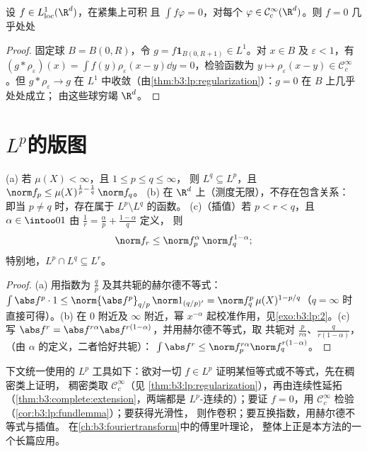 \begin{corollary}[变分法基本
引理]\label{cor:b3:lp:fundlemma}
设 $f \in L^1_{\mathrm{loc}}(\R^d)$，在紧集上可积
且 $\int f\varphi = 0$，对每个 $\varphi \in \mathcal
C^\infty_c(\R^d)$。则 $f = 0$ 几乎处处
\end{corollary}

\begin{proof}
固定球 $B = B(0, R)$，令 $g = f\mathbf 1_{B(0, R+1)}
\in L^1$。对 $x \in B$ 及 $\varepsilon < 1$，有 $(g *
\rho_\varepsilon)(x) = \int f(y)\rho_\varepsilon(x - y)\dd y =
0$，检验函数为 $y \mapsto \rho_\varepsilon(x-y)
\in \mathcal C_c^\infty$。但 $g * \rho_\varepsilon \to g$ 在
$L^1$ 中收敛（由\cref{thm:b3:lp:regularization}）：$g = 0$ 在 $B$ 上几乎处处成立；
由这些球穷竭 $\R^d$。
\end{proof}

\section{\texorpdfstring{$L^p$}{Lp}的版图}

\begin{proposition}\label{prop:b3:lp:inclusions}
(a) 若 $\mu(X) < \infty$，且 $1 \leq p \leq q \leq \infty$，
则 $L^q \subseteq L^p$，且 $\norm f_p \leq
\mu(X)^{\frac1p - \frac1q}\,\norm f_q$。
(b) 在 $\R^d$ 上（测度无限），不存在包含关系：
即当 $p \neq q$ 时，存在属于 $L^p\setminus L^q$ 的函数。
(c)（插值）若 $p < r < q$，且 $\alpha \in \intoo01$
由 $\frac1r = \frac\alpha p + \frac{1 - \alpha}q$ 定义，
则
\[
\norm f_r \leq \norm f_p^{\alpha}\,\norm f_q^{1 - \alpha} ;
\]
特别地，$L^p \cap L^q \subseteq L^r$。
\end{proposition}

\begin{proof}
(a) 用指数为 $\frac qp$ 及其共轭的赫尔德不等式：
$\int\abs f^p\cdot 1 \leq \norm{\abs f^p}_{q/p}\,\norm
1_{(q/p)'} = \norm f_q^p\,\mu(X)^{1 - p/q}$（$q = \infty$ 时
直接可得）。(b) 在 $0$ 附近及 $\infty$ 附近，幂 $x^{-\alpha}$
起校准作用，见\cref{exo:b3:lp:2}。(c) 写 $\abs f^r = \abs
f^{r\alpha}\abs f^{r(1-\alpha)}$，并用赫尔德不等式，取
共轭对 $\frac p{r\alpha}$、$\frac q{r(1-\alpha)}$，
（由 $\alpha$ 的定义，二者恰好共轭）：
$\int\abs f^r \leq \norm f_p^{r\alpha}\norm f_q^{r(1 -
\alpha)}$。
\end{proof}

\begin{method}\label{met:b3:lp:toolkit}
下文统一使用的 $L^p$ 工具如下：欲对一切
$f \in L^p$ 证明某恒等式或不等式，先在稠密类上证明，
稠密类取 $\mathcal C_c^\infty$（见
\cref{thm:b3:lp:regularization}），再由连续性延拓
（\cref{thm:b3:complete:extension}，两端都是
$L^p$-连续的）；要证 $f = 0$，用 $\mathcal
C_c^\infty$ 检验（\cref{cor:b3:lp:fundlemma}）；要获得光滑性，
则作卷积；要互换指数，用赫尔德不等式与插值。
在\cref{ch:b3:fouriertransform}中的傅里叶理论，
整体上正是本方法的一个长篇应用。
\end{method}

